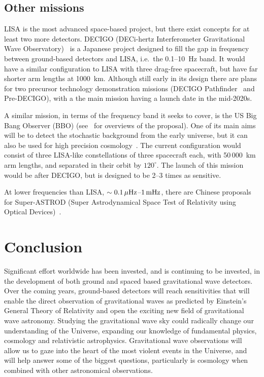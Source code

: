 \documentclass{article}
\begin{document}
\subsection{Other missions}

LISA is the most advanced space-based project, but there exist concepts for at
least two more detectors. DECIGO (DECi-hertz Interferometer Gravitational Wave
Observatory)~\cite{Sato:2009, Kawamura:2011} is a Japanese project designed to
fill the gap in frequency between ground-based detectors and LISA, i.e.\ the
0.1--10~Hz band. It would have a similar configuration to LISA with three
drag-free spacecraft, but have far shorter arm lengths at 1000~km. Although
still early in its design there are plans for two precursor technology
demonstration missions (DECIGO Pathfinder~\cite{Ando:2009} and Pre-DECIGO), with
a the main mission having a launch date in the mid-2020s.

A similar mission, in terms of the frequency band it seeks to cover, is the US
Big Bang Observer (BBO) (see~\cite{Crowder:2005, Cutler:2009, Harry:2006} for
overviews of the proposal). One of its main aims will be to detect the
stochastic background from the early universe, but it can also be used for high
precision cosmology~\cite{Cutler:2009}. The current configuration would consist
of three LISA-like constellations of three spacecraft each, with 50\,000~km arm
lengths, and separated in their orbit by $120^{\circ}$. The launch of this
mission would be after DECIGO, but is designed to be 2--3 times as sensitive.

At lower frequencies than LISA, $\sim0.1\,\mu{\rm Hz}$--$1\,{\rm mHz}$, there
are Chinese proposals for Super-ASTROD (Super Astrodynamical Space Test of
Relativity using Optical Devices)~\cite{Ni:2009}.


\newpage

\section{Conclusion}
\label{section:conclusion}

Significant effort worldwide has been invested, and is continuing to be
invested, in the development of both ground and spaced based gravitational wave
detectors. Over the coming years, ground-based detectors will reach
sensitivities that will enable the direct observation of gravitational waves as
predicted by Einstein's General Theory of Relativity and open the exciting new
field of gravitational wave astronomy. Studying the gravitational wave
sky could radically change our understanding of the Universe, expanding our
knowledge of fundamental physics, cosmology and relativistic astrophysics.
Gravitational wave observations will allow us to gaze into the heart of the most
violent events in the Universe, and will help answer some of the biggest
questions, particularly is cosmology when combined with other astronomical
observations.
\end{document}
